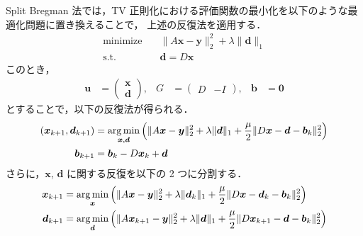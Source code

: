 Split Bregman 法では，TV 正則化における評価関数の最小化を以下のような最適化問題に置き換えることで，
上述の反復法を適用する．
\begin{align}
    \text{minimize} \hspace{1em} & \|A \bm{x} - \bm{y}\|_2^2 + \lambda \|\bm{d}\|_1 \\
    \text{s.t.} \hspace{1em}     & \bm{d} = D \bm{x}
\end{align}
このとき，
\begin{align}
    \bm{u} & = \begin{pmatrix}
                   \bm{x} \\ \bm{d}
               \end{pmatrix}
    ,      &
    G      & = \begin{pmatrix}
                   D & -I
               \end{pmatrix}
    ,      &
    \bm{b} & = \bm{0}
\end{align}
とすることで，以下の反復法が得られる．
\begin{align}
    (\bm{x}_{k+1}, \bm{d}_{k+1}) & =
    \operatorname*{arg \thinspace min}_{\bm{x}, \bm{d}} \left( \|A \bm{x} - \bm{y}\|_2^2 + \lambda \|\bm{d}\|_1
    + \frac{\mu}{2} \|D \bm{x} - \bm{d} - \bm{b}_k\|_2^2
    \right)
    \\
    \bm{b}_{k+1}                 & = \bm{b}_k - D \bm{x}_k + \bm{d}
\end{align}
さらに，$\bm{x}$, $\bm{d}$ に関する反復を以下の 2 つに分割する．
\begin{align}
    \bm{x}_{k+1} & =
    \operatorname*{arg \thinspace min}_{\bm{x}} \left( \|A \bm{x} - \bm{y}\|_2^2 + \lambda \|\bm{d}_k\|_1
    + \frac{\mu}{2} \|D \bm{x} - \bm{d}_k - \bm{b}_k\|_2^2
    \right)
    \\
    \bm{d}_{k+1} & =
    \operatorname*{arg \thinspace min}_{\bm{d}} \left( \|A \bm{x}_{k+1} - \bm{y}\|_2^2 + \lambda \|\bm{d}\|_1
    + \frac{\mu}{2} \|D \bm{x}_{k+1} - \bm{d} - \bm{b}_k\|_2^2
    \right)
\end{align}

